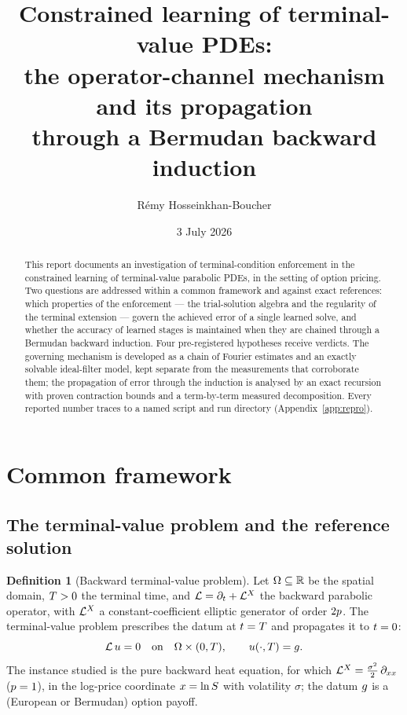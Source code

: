 \documentclass[11pt]{article}
\title{Constrained learning of terminal-value PDEs:\\
  the operator-channel mechanism and its propagation\\
  through a Bermudan backward induction}
\author{R\'emy Hosseinkhan-Boucher}
\date{3 July 2026}
\theoremstyle{plain}
\theoremstyle{definition}
\newtheorem{definition}[theorem]{Definition}
\theoremstyle{remark}
\begin{document}
\maketitle

\begin{abstract}
This report documents an investigation of terminal-condition enforcement in the
constrained learning of terminal-value parabolic PDEs, in the setting of option
pricing. Two questions are addressed within a common framework and against exact
references: which properties of the enforcement --- the trial-solution algebra
and the regularity of the terminal extension --- govern the achieved error of a
single learned solve, and whether the accuracy of learned stages is maintained
when they are chained through a Bermudan backward induction. Four pre-registered
hypotheses receive verdicts. The governing mechanism is developed as a chain of
Fourier estimates and an exactly solvable ideal-filter model, kept separate from
the measurements that corroborate them; the propagation of error through the
induction is analysed by an exact recursion with proven contraction bounds and a
term-by-term measured decomposition. Every reported number traces to a named
script and run directory (Appendix~\ref{app:repro}).
\end{abstract}

\section{Common framework}\label{sec:framework}

\subsection{The terminal-value problem and the reference solution}\label{sec:problem}

\begin{definition}[Backward terminal-value problem]\label{def:problem}
Let $\Omega\subseteq\mathbb{R}$ be the spatial domain, $T>0$ the terminal
time, and $\mathcal{L}=\partial_{t}+\mathcal{L}^{X}$ the backward
parabolic operator, with $\mathcal{L}^{X}$ a constant-coefficient elliptic
generator of order $2p$. The terminal-value problem prescribes
the datum at $t=T$ and propagates it to $t=0$:
\begin{equation}\label{eq:tvp}
  \mathcal{L}\,u=0
  \quad\text{on}\quad \Omega\times(0,T),
  \qquad
  u(\cdot,T)=g .
\end{equation}
The instance studied is the pure backward heat equation, for which
$\mathcal{L}^{X}=\tfrac{\sigma^{2}}{2}\,\partial_{xx}$
($p=1$), in the log-price coordinate
$x=\ln S$ with volatility $\sigma$; the datum $g$ is a
(European or Bermudan) option payoff.
\end{definition}
\end{document}

